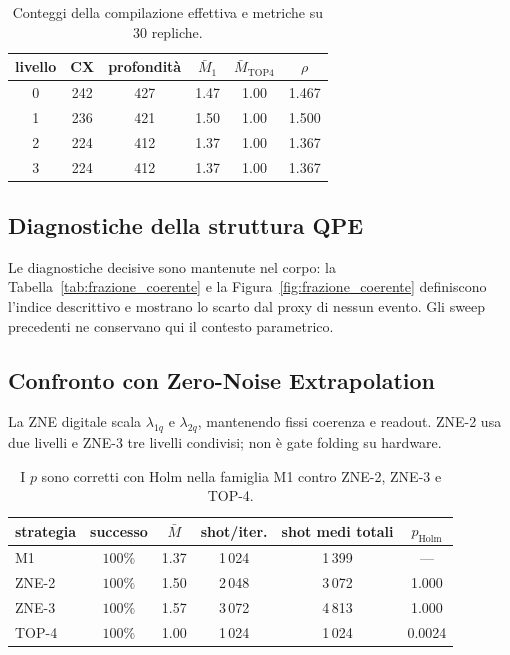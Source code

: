 \begin{onehalfspace}
\begin{table}[H]
\centering
\caption[Sweep di \texttt{optimization\_level}]{Conteggi della
compilazione effettiva e metriche su 30 repliche.}
\label{tab:sweep_optlevel}
\label{tab:sensitivity}
\begin{tabular}{cccccc}
\toprule
livello & CX & profondità & $\bar M_1$ & $\bar M_{\mathrm{TOP4}}$ & $\rho$ \\
\midrule
0 & 242 & 427 & 1.47 & 1.00 & 1.467 \\
1 & 236 & 421 & 1.50 & 1.00 & 1.500 \\
2 & 224 & 412 & 1.37 & 1.00 & 1.367 \\
3 & 224 & 412 & 1.37 & 1.00 & 1.367 \\
\bottomrule
\end{tabular}
\end{table}

\subsection{Diagnostiche della struttura QPE}

Le diagnostiche decisive sono mantenute nel corpo: la
Tabella~\ref{tab:frazione_coerente} e la
Figura~\ref{fig:frazione_coerente} definiscono l'indice descrittivo e mostrano
lo scarto dal proxy di nessun evento. Gli sweep precedenti ne conservano qui
il contesto parametrico.

\subsection{Confronto con Zero-Noise Extrapolation}
\label{sec:app_zne}

La ZNE digitale scala $\lambda_{1q}$ e $\lambda_{2q}$, mantenendo fissi
coerenza e readout. ZNE-2 usa due livelli e ZNE-3 tre livelli condivisi;
non è gate folding su hardware.

\begin{table}[H]
\centering
\caption[Confronto ZNE appaiato]{I $p$ sono corretti con Holm nella
famiglia M1 contro ZNE-2, ZNE-3 e TOP-4.}
\label{tab:confronto_zne}
\begin{tabular}{lccccc}
\toprule
strategia & successo & $\bar M$ & shot/iter. & shot medi totali & $p_{\mathrm{Holm}}$ \\
\midrule
M1 & $100\%$ & 1.37 & 1\,024 & 1\,399 & --- \\
ZNE-2 & $100\%$ & 1.50 & 2\,048 & 3\,072 & 1.000 \\
ZNE-3 & $100\%$ & 1.57 & 3\,072 & 4\,813 & 1.000 \\
TOP-4 & $100\%$ & 1.00 & 1\,024 & 1\,024 & 0.0024 \\
\bottomrule
\end{tabular}
\end{table}


\end{onehalfspace}
